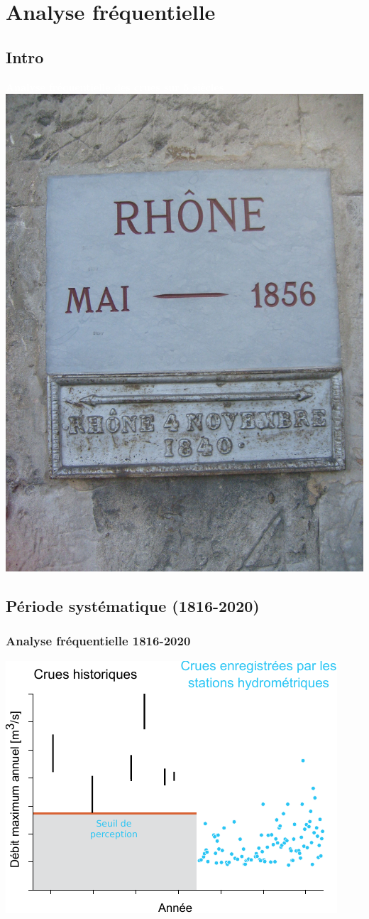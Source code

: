 \documentclass[compress,9pt]{beamer}
\begin{document}
\section{Analyse fréquentielle}
	\subsection{Intro}
	{
    \begin{frame}
        \begin{center}
        	\vfill
		 	\textcolor{white}{\large \textbf{Analyse fréquentielle des crues sur 5 siècles}}\\
		 	\vspace{0.8cm}
		 	\includegraphics[width = .3\textwidth]{./Figures/RepAvi.jpg} 
        \end{center}
    \end{frame}
    }

	\subsection{Période systématique (1816-2020)}
	\begin{frame}
		\frametitle{Analyse fréquentielle 1816-2020}
		\centering
		\includegraphics[width = .7\textwidth]{./Figures/HistoFloodsAll.pdf} 
	\end{frame}
	
\end{document}
